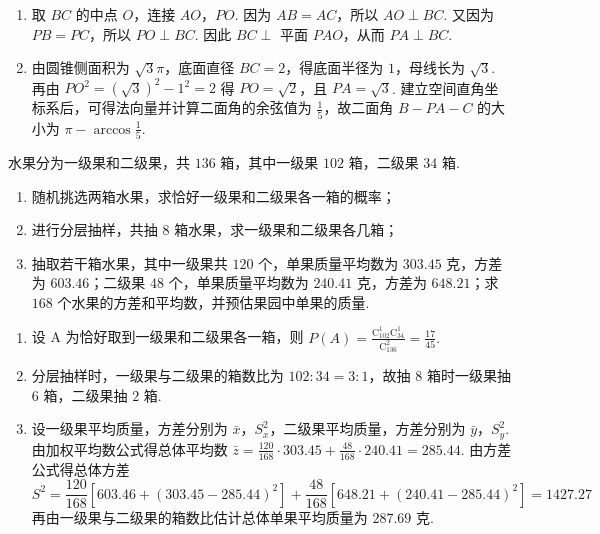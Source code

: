 \begin{solution}
\begin{enumerate}
\item 取 \(BC\) 的中点 \(O\)，连接 \(AO\)，\(PO\). 因为 \(AB=AC\)，所以 \(AO\perp BC\). 又因为 \(PB=PC\)，所以 \(PO\perp BC\). 因此 \(BC\perp\) 平面 \(PAO\)，从而 \(PA\perp BC\).

\item 由圆锥侧面积为 \(\sqrt3\pi\)，底面直径 \(BC=2\)，得底面半径为 \(1\)，母线长为 \(\sqrt3\). 再由 \(PO^2=\left(\sqrt3\right)^2-1^2=2\) 得 \(PO=\sqrt2\)，且 \(PA=\sqrt3\). 建立空间直角坐标系后，可得法向量并计算二面角的余弦值为 \(\frac15\)，故二面角 \(B-PA-C\) 的大小为 \(\pi-\arccos\frac15\).
\end{enumerate}
\end{solution}

\begin{problem}
水果分为一级果和二级果，共 \(136\) 箱，其中一级果 \(102\) 箱，二级果 \(34\) 箱.

\begin{enumerate}
\item 随机挑选两箱水果，求恰好一级果和二级果各一箱的概率；
\item 进行分层抽样，共抽 \(8\) 箱水果，求一级果和二级果各几箱；
\item 抽取若干箱水果，其中一级果共 \(120\) 个，单果质量平均数为 \(303.45\) 克，方差为 \(603.46\)；二级果 \(48\) 个，单果质量平均数为 \(240.41\) 克，方差为 \(648.21\)；求 \(168\) 个水果的方差和平均数，并预估果园中单果的质量.
\end{enumerate}
\end{problem}

\begin{solution}
\begin{enumerate}
\item 设 A 为恰好取到一级果和二级果各一箱，则
\(P(A)=\frac{\mathrm C_{102}^1\mathrm C_{34}^1}{\mathrm C_{136}^2}
=\frac{17}{45}.\)

\item 分层抽样时，一级果与二级果的箱数比为 \(102:34=3:1\)，故抽 \(8\) 箱时一级果抽 \(6\) 箱，二级果抽 \(2\) 箱.

\item 设一级果平均质量，方差分别为 \(\bar x\)，\(S_x^2\)，二级果平均质量，方差分别为 \(\bar y\)，\(S_y^2\). 由加权平均数公式得总体平均数
\(\bar z=\frac{120}{168}\cdot 303.45+\frac{48}{168}\cdot 240.41=285.44\).
由方差公式得总体方差
\[
S^2=\frac{120}{168}\left[603.46+\left(303.45-285.44\right)^2\right]+\frac{48}{168}\left[648.21+\left(240.41-285.44\right)^2\right]=1427.27
\]
再由一级果与二级果的箱数比估计总体单果平均质量为 \(287.69\) 克.
\end{enumerate}
\end{solution}

